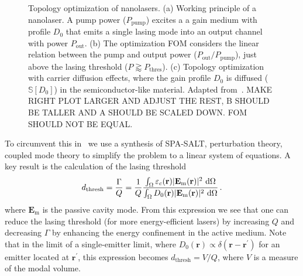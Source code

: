 \begin{figure}[tb]
    \centering
    \caption{Topology optimization of nanolasers. (a) Working principle of a nanolaser. A pump power ($P_\text{pump}$) excites a a gain medium with profile
    $D_0$ that emits a single lasing mode into an output channel with power $P_\text{out}$. (b) The optimization FOM considers the linear relation between the pump and output power ($P_\text{out}/P_\text{pump}$),
    just above the lasing threshold ($P \gtrapprox P_\text{thres}$). (c) Topology optimization with carrier diffusion effects, where the gain profile $D_0$ is diffused ($\mathbb{S}[D_0]$)
    in the semiconductor-like material. Adapted from~\cite{ownpub4}. MAKE RIGHT PLOT LARGER AND ADJUST THE REST, B SHOULD BE TALLER AND A SHOULD BE SCALED DOWN. FOM SHOULD NOT BE EQUAL.}
    \label{fig:laser2d}
\end{figure}

To circumvent this in~\cite{ownpub4} we use a synthesis of SPA-SALT, perturbation theory, coupled mode theory to simplify the problem to a linear system of equations. 
A key result is the calculation of the lasing threshold~\cite{ownpub4}
\begin{equation}\label{eq:pump_thresh}
    d_\text{thresh} = \frac{\Gamma}{Q} = \frac{1}{Q} \frac{\int_{\Omega} \varepsilon_c(\mathbf{r})|\mathbf{E}_{\text{m}}(\mathbf{r})|^2\,  \mathop{}\!\text{d} \Omega}{\int_{\Omega} D_0(\mathbf{r}) |\mathbf{E}_{\text{m}}(\mathbf{r})|^2\,  \mathop{}\!\text{d} \Omega}\,.
\end{equation}
where $\mathbf{E}_\text{m}$ is the passive cavity mode. From this expression we see that one can reduce the lasing threshold (for more energy-efficient lasers) by increasing $Q$ and decreasing $\Gamma$ by enhancing the energy confinement in the
active medium. Note that in the limit of a single-emitter limit, where $D_0(\mathbf{r})\propto \delta (\mathbf{r}-\mathbf{r^\prime})$ for an emitter located at $\mathbf{r}^\prime$, this expression becomes $d_\text{thresh}=V/Q$, where $V$ is a measure
of the modal volume.

